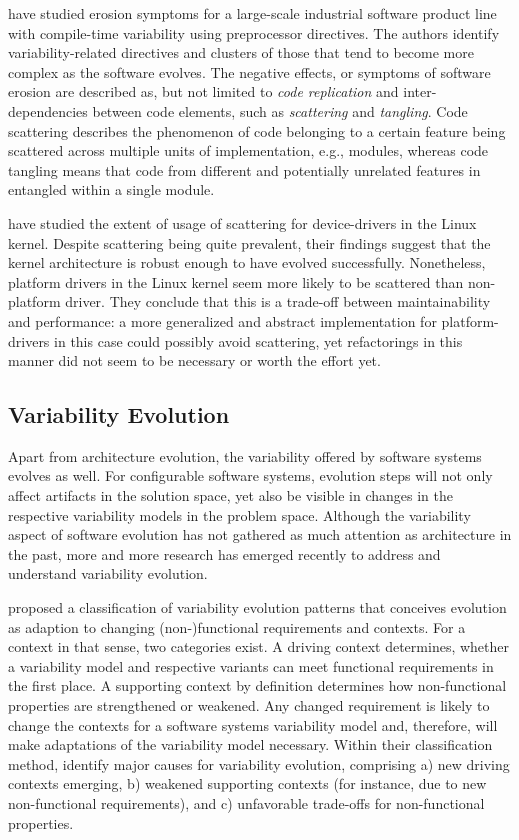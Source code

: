 \cite{zhang_variability_2013} have studied erosion symptoms for a large-scale
industrial software product line with compile-time variability using
preprocessor directives.
The authors identify variability-related directives and clusters of those that
tend to become more complex as the software evolves. The negative effects, or symptoms of software
erosion are described as, but not limited to \emph{code replication} and
inter-dependencies between code elements, such as \emph{scattering} and
\emph{tangling}. Code scattering describes the phenomenon of code belonging to
a certain feature being scattered across multiple units of implementation,
e.g., modules, whereas code tangling means that code from different and
potentially unrelated features in entangled within a single module.

\cite{passos_feature_2015} have studied the extent of usage of scattering for device-drivers
in the Linux kernel. Despite scattering being quite prevalent, their
findings suggest that the kernel architecture is robust enough to have evolved
successfully. Nonetheless, platform drivers in the Linux kernel seem more
likely to be scattered than non-platform driver. They conclude that this is a
trade-off between maintainability and performance: a more generalized and
abstract implementation for platform-drivers in this case could possibly avoid
scattering, yet refactorings in this manner did not seem to be necessary or
worth the effort yet.

\subsection{Variability Evolution}
Apart from architecture evolution, the variability offered by software systems
evolves as well. For configurable software systems,
evolution steps will not only affect artifacts in the solution space, yet also
be visible in changes in the respective variability models in the problem space.
Although the variability aspect of software evolution has not gathered as
much attention as architecture in the past, more and more
research has emerged recently to address and understand variability evolution.

\cite{peng_analyzing_2011} proposed a classification of variability evolution patterns that
conceives evolution as adaption to changing (non-)functional requirements and
contexts. For a context in that sense, two categories exist. A driving context
determines, whether a variability model and respective variants can meet
functional requirements in the first place. A supporting context by definition
determines how non-functional properties are strengthened or weakened. 
Any changed requirement is likely to change the contexts for a software systems
variability model and, therefore, will make adaptations of the variability
model necessary. Within their classification method, \cite{peng_analyzing_2011} identify major
causes for variability evolution, comprising a) new driving contexts emerging, b) weakened supporting contexts (for instance, due to new
non-functional requirements), and c) unfavorable trade-offs for non-functional
properties. 

